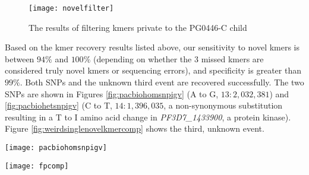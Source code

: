 \begin{figure}[h!]
  \centering
    \texttt{[image: novelfilter]}
  \caption{The results of filtering kmers private to the PG0446-C child }
  \label{fig:novelfilter}
\end{figure}

Based on the kmer recovery results listed above, our sensitivity to novel kmers is between $94\%$ and $100\%$ (depending on whether the $3$ missed kmers are considered truly novel kmers or sequencing errors), and specificity is greater than $99\%$.  Both SNPs and the unknown third event are recovered successfully.  The two SNPs are shown in Figures \ref{fig:pacbiohomsnpigv} (A to G, $13:2,032,381$) and \ref{fig:pacbiohetsnpigv} (C to T, $14:1,396,035$, a non-synonymous substitution resulting in a T to I amino acid change in \textit{PF3D7\_1433900}, a protein kinase).  Figure \ref{fig:weirdsinglenovelkmercomp} shows the third, unknown event.

\begin{sidewaysfigure}[h!]
  \centering
    \texttt{[image: pacbiohomsnpigv]}
  \caption{IGV screenshot of an A to G SNP, showing reads and assembly information for the trio, aligned to the PacBio PG0446-C assembly.  Top panel: 803.  Middle two: GB4 reads and PacBio assembly (sliced to facilitate alignment).  Lower two: PG0446-C reads and contig containing the variant in question from the a. panel.}
  \label{fig:pacbiohomsnpigv}
\end{sidewaysfigure}

\begin{sidewaysfigure}[h!]
  \centering
    \texttt{[image: fpcomp]}
  \caption{A C to T SNP that has likely not reached fixation in the sequenced population of ostensibly clonal parasites.  a. Local subgraph at the site, wherein the child's graph contains paths that traverse the series of novel kmers as well as the parental kmers, indicating polymorphic status.  b. IGV screenshot of the site showing reads and assembly information for the trio, aligned to the 3D7 reference genome.  Top panel: positions of the called variants in the reference-basde analysis.  Second panel: PG0443-C (803).  Third: PG0050-CX2 (GB4).  Fourth: PG0446-C (child).  Fifth: Uncorrected PacBio reads from PG0446-C.  Bottom: gene model track from PlasmoDB $9.0$.  Stacked barplots above tracks indicate the proportion of reads supporting each allele.}
  \label{fig:pacbiohetsnpigv}
\end{sidewaysfigure}

